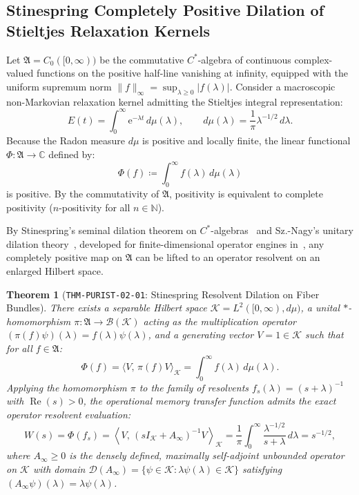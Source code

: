 \documentclass[11pt,a4paper,reqno]{article}
\theoremstyle{plain}
\newtheorem{theorem}{Theorem}[section]
\theoremstyle{definition}
\theoremstyle{remark}
\numberwithin{equation}{section}
\begin{document}
\subsection{Stinespring Completely Positive Dilation of Stieltjes Relaxation Kernels}
Let $\mathfrak{A} = C_0([0,\infty))$ be the commutative $C^*$-algebra of continuous complex-valued functions on the positive half-line vanishing at infinity, equipped with the uniform supremum norm $\|f\|_\infty = \sup_{\lambda \ge 0} |f(\lambda)|$. Consider a macroscopic non-Markovian relaxation kernel admitting the Stieltjes integral representation:
\begin{equation}
  E(t) = \int_0^\infty \mathrm{e}^{-\lambda t} \, d\mu(\lambda), \qquad d\mu(\lambda) = \frac{1}{\pi} \lambda^{-1/2} \, d\lambda.
  \label{eq:stieltjes_measure}
\end{equation}
Because the Radon measure $d\mu$ is positive and locally finite, the linear functional $\Phi : \mathfrak{A} \to \mathbb{C}$ defined by:
\begin{equation}
  \Phi(f) \coloneqq \int_0^\infty f(\lambda) \, d\mu(\lambda)
\end{equation}
is positive. By the commutativity of $\mathfrak{A}$, positivity is equivalent to complete positivity ($n$-positivity for all $n \in \mathbb{N}$). 

By Stinespring's seminal dilation theorem on $C^*$-algebras~\cite{stinespring1955} and Sz.-Nagy's unitary dilation theory~\cite{sznagy1970}, developed for finite-dimensional operator engines in~\cite{FiniteDimV100}, any completely positive map on $\mathfrak{A}$ can be lifted to an operator resolvent on an enlarged Hilbert space.

\begin{theorem}[\texttt{THM-PURIST-02-01}: Stinespring Resolvent Dilation on Fiber Bundles]
\label{thm:stinespring_dilation}
There exists a separable Hilbert space $\mathcal{K} = L^2([0,\infty), d\mu)$, a unital $*$-homomorphism $\pi : \mathfrak{A} \to \mathcal{B}(\mathcal{K})$ acting as the multiplication operator $(\pi(f)\psi)(\lambda) = f(\lambda)\psi(\lambda)$, and a generating vector $V = 1 \in \mathcal{K}$ such that for all $f \in \mathfrak{A}$:
\begin{equation}
  \Phi(f) = \langle V, \, \pi(f) V \rangle_{\mathcal{K}} = \int_0^\infty f(\lambda) \, d\mu(\lambda).
\end{equation}
Applying the homomorphism $\pi$ to the family of resolvents $f_s(\lambda) = (s + \lambda)^{-1}$ with $\operatorname{Re}(s) > 0$, the operational memory transfer function admits the exact operator resolvent evaluation:
\begin{equation}
  W(s) = \Phi(f_s) = \left\langle V, \, (sI_{\mathcal{K}} + A_\infty)^{-1} V \right\rangle_{\mathcal{K}} = \frac{1}{\pi}\int_0^\infty \frac{\lambda^{-1/2}}{s + \lambda} \, d\lambda = s^{-1/2},
  \label{eq:resolvent_transfer}
\end{equation}
where $A_\infty \ge 0$ is the densely defined, maximally self-adjoint unbounded operator on $\mathcal{K}$ with domain $\mathcal{D}(A_\infty) = \{ \psi \in \mathcal{K} : \lambda \psi(\lambda) \in \mathcal{K} \}$ satisfying $(A_\infty \psi)(\lambda) = \lambda \psi(\lambda)$.
\end{theorem}
\end{document}
